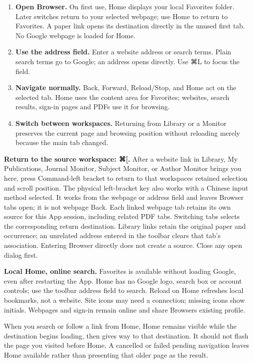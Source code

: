 \documentclass[10pt,letterpaper,oneside]{scrreprt}
\providecommand{\tightlist}{\setlength{\itemsep}{1pt}\setlength{\parskip}{0pt}}
\begin{document}
\begin{enumerate}
\tightlist
\item
  \textbf{Open Browser.} On first use, Home displays your local Favorites folder. Later switches return to your selected webpage; use Home to return to Favorites. A paper link opens its destination directly in the unused first tab. No Google webpage is loaded for Home.
\item
  \textbf{Use the address field.} Enter a website address or search terms. Plain search terms go to Google; an address opens directly. Use {{\symbolfont ⌘}L} to focus the field.
\item
  \textbf{Navigate normally.} Back, Forward, Reload/Stop, and Home act on the selected tab. Home uses the content area for Favorites; websites, search results, sign-in pages and PDFs use it for browsing.
\item
  \textbf{Switch between workspaces.} Returning from Library or a Monitor preserves the current page and browsing position without reloading merely because the main tab changed.
\end{enumerate}

\textbf{Return to the source workspace: {{\symbolfont ⌘}{[}}.} After a website link in Library, My Publications, Journal Monitor, Subject Monitor, or Author Monitor brings you here, press Command-left bracket to return to that workspace\textquotesingle s retained selection and scroll position. The physical left-bracket key also works with a Chinese input method selected. It works from the webpage or address field and leaves Browser tabs open; it is not webpage Back. Each linked webpage tab retains its own source for this App session, including related PDF tabs. Switching tabs selects the corresponding return destination. Library links retain the original paper and occurrence; an unrelated address entered in the toolbar clears that tab's association. Entering Browser directly does not create a source. Close any open dialog first.

\textbf{Local Home, online search.} Favorites is available without loading Google, even after restarting the App. Home has no Google logo, search box or account controls; use the toolbar address field to search. Reload on Home refreshes local bookmarks, not a website. Site icons may need a connection; missing icons show initials. Webpages and sign-in remain online and share Browser\textquotesingle s existing profile.

When you search or follow a link from Home, Home remains visible while the destination begins loading, then gives way to that destination. It should not flash the page you visited before Home. A cancelled or failed pending navigation leaves Home available rather than presenting that older page as the result.
\end{document}
